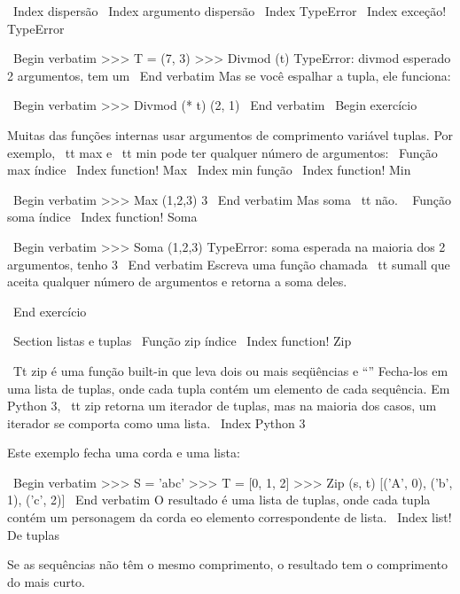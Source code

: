 \documentclass[10pt]{book}
\begin{document}
\begin {itemize}
{{{{{{{{%

%
\ Index {dispersão}
\ Index {argumento dispersão}
\ Index {} TypeError
\ Index {exceção! TypeError}

\ Begin {verbatim}
>>> T = (7, 3)
>>> Divmod (t)
TypeError: divmod esperado 2 argumentos, tem um
\ End {verbatim}
%
Mas se você espalhar a tupla, ele funciona:

\ Begin {verbatim}
>>> Divmod (* t)
(2, 1)
\ End {verbatim}
%
\ Begin {} exercício

Muitas das funções internas usar
argumentos de comprimento variável tuplas. Por exemplo, {\ tt max}
e {\ tt min} pode ter qualquer número de argumentos:
\ {Função max} índice
\ Index {function! Max}
\ Index {min função}
\ Index {function! Min}

\ Begin {verbatim}
>>> Max (1,2,3)
3
\ End {verbatim}
%
Mas {soma \ tt} não.
\ {} Função soma índice
\ Index {function! Soma}

\ Begin {verbatim}
>>> Soma (1,2,3)
TypeError: soma esperada na maioria dos 2 argumentos, tenho 3
\ End {verbatim}
%
Escreva uma função chamada {\ tt sumall} que aceita qualquer número
de argumentos e retorna a soma deles.

\ End {} exercício


\ Section {listas e tuplas}
\ {Função zip} índice
\ Index {function! Zip}

{\ Tt zip} é uma função built-in que leva dois ou mais seqüências e
``'' Fecha-los em uma lista de tuplas, onde cada tupla contém um
elemento de cada sequência. Em Python 3, {\ tt zip} retorna um iterador
de tuplas, mas na maioria dos casos, um iterador se comporta como uma lista.
\ Index {Python 3}

Este exemplo fecha uma corda e uma lista:

\ Begin {verbatim}
>>> S = 'abc'
>>> T = [0, 1, 2]
>>> Zip (s, t)
[('A', 0), ('b', 1), ('c', 2)]
\ End {verbatim}
%
O resultado é uma lista de tuplas, onde cada tupla contém
um personagem da corda eo elemento correspondente de
lista.
\ Index {list! De tuplas}

Se as sequências não têm o mesmo comprimento, o resultado tem o
comprimento do mais curto.

}}}}}}}}
\end{itemize}
\end{document}
